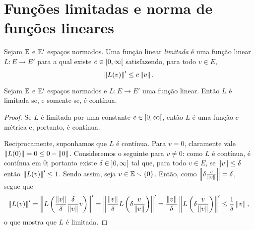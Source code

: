 \section{Funções limitadas e norma de funções lineares}

\begin{definition}
Sejam $\mathbb{E}$ e $\mathbb{E}'$ espaços normados. Uma função linear \emph{limitada} é uma função linear $L\colon E \to E'$ para a qual existe $c \in \left[{0},{\infty}\right[$ satisfazendo, para todo $v \in E$,
	\begin{equation*}
	\left\Vert{L(v)}\right\Vert' \leq c \left\Vert{v}\right\Vert.
	\end{equation*}
\end{definition}


\begin{proposition}
Sejam $\mathbb{E}$ e $\mathbb{E}'$ espaços normados e $L\colon E \to E'$ uma função linear. Então $L$ é limitada se, e somente se, é contínua.
\end{proposition}
\begin{proof}
Se $L$ é limitada por uma constante $c \in \left[{0},{\infty}\right[$, então $L$ é uma função $c$-métrica e, portanto, é contínua.

Reciprocamente, suponhamos que $L$ é contínua. Para $v=0$, claramente vale $\left\Vert{L(0)}\right\Vert = 0 \leq 0 - \left\Vert{0}\right\Vert$. Consideremos o seguinte para $v \neq 0$: como $L$ é contínua, é contínua em $0$; portanto existe $\delta \in \left]{0},{\infty}\right[$ tal que, para todo $v \in E$, se $\left\Vert{v}\right\Vert \leq \delta$ então $\left\Vert{L(v)}\right\Vert' \leq 1$. Sendo assim, seja $v \in \mathbb{E} \smallsetminus \{0\}$. Então, como $\left\Vert{\delta\frac{v}{\left\Vert{v}\right\Vert}}\right\Vert=\delta$, segue que
	\begin{equation*}
	\left\Vert{L(v)}\right\Vert' = \left\Vert{L\left(\frac{\left\Vert{v}\right\Vert}{\delta}\frac{\delta}{\left\Vert{v}\right\Vert}v\right)}\right\Vert' = \left\Vert{\frac{\left\Vert{v}\right\Vert}{\delta}L\left(\delta\frac{v}{\left\Vert{v}\right\Vert}\right)}\right\Vert' = \frac{\left\Vert{v}\right\Vert}{\delta}\left\Vert{L\left(\delta\frac{v}{\left\Vert{v}\right\Vert}\right)}\right\Vert' \leq \frac{1}{\delta}\left\Vert{v}\right\Vert,
	\end{equation*}
o que mostra que $L$ é limitada.
\end{proof}

